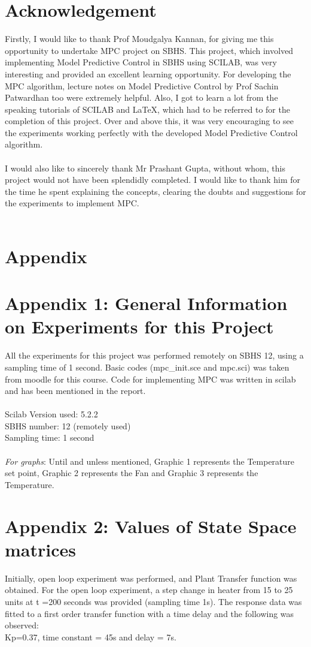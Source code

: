 \section{Acknowledgement }
Firstly, I would like to thank Prof Moudgalya Kannan, for giving me this opportunity to undertake MPC project on SBHS. This project, which involved implementing Model Predictive Control in SBHS using SCILAB, was very interesting and provided an excellent learning opportunity. For developing the MPC algorithm, lecture notes on Model Predictive Control by Prof Sachin Patwardhan too were extremely helpful. Also, I got to learn a lot from the speaking tutorials of SCILAB and LaTeX, which had to be referred to for the completion of this project. Over and above this, it was very encouraging to see the experiments working perfectly with the developed Model Predictive Control algorithm.
\\ \\
I would also like to sincerely thank Mr Prashant Gupta, without whom, this project would not have been splendidly completed. I would like to thank him for the time he spent explaining the concepts, clearing the doubts and suggestions for the experiments to implement MPC.
\\ \\

\section{Appendix}
\section{Appendix 1: General Information on Experiments for this Project}
All the experiments for this project was performed remotely on SBHS 12, using a sampling time of 1 second. Basic codes (mpc\_init.sce and mpc.sci) was taken from moodle for this course. Code for implementing MPC was written in scilab and has been mentioned in the report. \\ \\
Scilab Version used: 5.2.2 \\
SBHS number: 12 (remotely used) \\
Sampling time: 1 second \\ \\
\emph{For graphs}: Until and unless mentioned, Graphic 1 represents the Temperature set point, Graphic 2 represents the Fan and Graphic 3 represents the Temperature.

\section{Appendix 2: Values of State Space matrices}
Initially, open loop experiment was performed, and Plant Transfer function was obtained. For the open loop experiment, a step change in heater from 15 to 25 units at t =200 seconds was provided (sampling time 1s). The response data was fitted to a first order transfer function with a time delay and the following was observed: \\
Kp=0.37, time constant = 45s and delay = 7s. \\ \\

